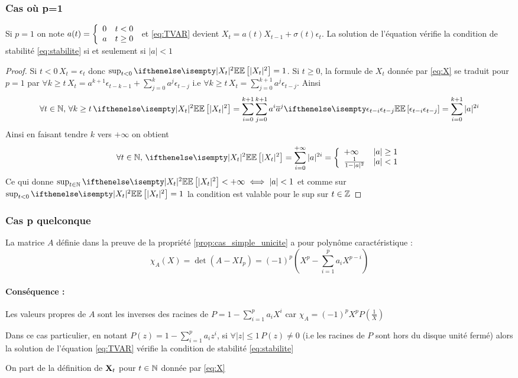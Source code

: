 \documentclass[a4paper,french]{article}
\begin{document}
\subsubsection{Cas où p=1}
\begin{Prop}
Si $p=1$ on note $a(t)= { \left\lbrace \begin{array}{ll} 
0 & t<0 \\
a & t \geq 0 \\ \end{array} \right. } $ et \eqref{eq:TVAR} devient $X_t = a(t)X_{t-1} + \sigma(t) \epsilon_t$. La solution de l'équation vérifie la condition de stabilité \eqref{eq:stabilite} si et seulement si $|a| < 1$
\end{Prop}
\begin{proof}
Si $t < 0\, X_t = \epsilon_t$ donc $\sup_{t < 0} \EE[|X_t|^2] = 1$. Si $t\geq 0$, la formule de $X_t$ donnée par \eqref{eq:X} se traduit pour $p=1$ par
$ \forall k \geq t \,  X_t = a^{k+1}\epsilon_{t-k-1} + \sum_{j=0}^k a^j \epsilon_{t-j} $ i.e $\forall k \geq t \, X_t = \sum_{j=0}^{k+1} a^j\epsilon_{t-j}$.
Ainsi 
\[ \forall t \in \nset, \, \forall k \geq t \, \EE[|X_t|^2] = \sum_{i=0}^{k+1} \sum_{j=0}^{k+1} a^i \overline{a}^j \EE[\epsilon_{t-i} \epsilon_{t-j}]= \sum_{i=0}^{k+1} |a|^{2i} \]
Ainsi en faisant tendre $k$ vers $+\infty$ on obtient 
 \[ \forall t \in \nset, \, \EE[|X_t|^2] = \sum_{i=0}^{+\infty} |a|^{2i} = \piecewise{
+\infty & |a|\geq 1 \\
\frac{1}{1-|a|^2} & |a| < 1} \]
Ce qui donne $\sup_{t\in \nset} \EE[|X_t|^2] < +\infty \iff |a| < 1$ et comme sur $\sup_{t < 0} \EE[|X_t|^2] = 1$ la condition est valable pour le sup sur $t\in \mathbb{Z}$
\end{proof}

\subsubsection{Cas p quelconque}
\begin{Lem}
La matrice $A$ définie dans la preuve de la propriété \ref{prop:cas_simple_unicite} a pour polynôme caractéristique : 
\[
\chi_A (X)= \det(A-XI_p) = (-1)^p \left( X^p - \sum_{i=1}^p a_i X^{p-i} \right)
\]
\end{Lem}
\paragraph{Conséquence :}
Les valeurs propres de $A$ sont les inverses des racines de $P = 1- \sum_{i=1}^p a_i X^i$
car $\chi_A = (-1)^p X^p P\left( \frac{1}{X}\right)$
\begin{Prop}
Dans ce cas particulier, en notant $P(z) = 1 - \sum_{i=1}^p a_i z^i$, si $\forall |z| \leq 1\, P(z)\neq 0$ (i.e les racines de $P$ sont hors du disque unité fermé) alors la solution de l'équation \eqref{eq:TVAR} vérifie la condition de stabilité \eqref{eq:stabilite}
\end{Prop}
On part de la définition de $\mathbf{X}_t$ pour $t \in \mathbb{N} $ donnée par \eqref{eq:X}
\end{document}
